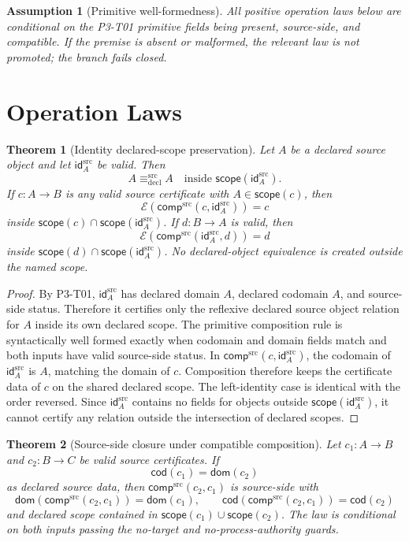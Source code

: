 \documentclass[11pt]{article}
\newcommand{\Cdom}{\mathsf{dom}}
\newcommand{\Ccod}{\mathsf{cod}}
\newcommand{\CId}{\mathsf{id}^{\mathrm{src}}}
\newcommand{\CComp}{\mathsf{comp}^{\mathrm{src}}}
\newcommand{\Scope}{\mathsf{scope}}
\newcommand{\DeclEq}{\equiv_{\mathrm{decl}}^{\mathrm{src}}}
\newtheorem{assumption}{Assumption}
\newtheorem{theorem}{Theorem}
\begin{document}
\begin{assumption}[Primitive well-formedness]
All positive operation laws below are conditional on the P3-T01 primitive
fields being present, source-side, and compatible. If the premise is absent or
malformed, the relevant law is not promoted; the branch fails closed.
\end{assumption}

\section{Operation Laws}

\begin{theorem}[Identity declared-scope preservation]
Let \(A\) be a declared source object and let \(\CId_A\) be valid. Then
\[
  A \DeclEq A \quad \text{inside } \Scope(\CId_A).
\]
If \(c:A\to B\) is any valid source certificate with \(A\in\Scope(c)\), then
\[
  \mathcal E(\CComp(c,\CId_A)) = c
\]
inside \(\Scope(c)\cap\Scope(\CId_A)\). If \(d:B\to A\) is valid, then
\[
  \mathcal E(\CComp(\CId_A,d)) = d
\]
inside \(\Scope(d)\cap\Scope(\CId_A)\). No declared-object equivalence is
created outside the named scope.
\end{theorem}

\begin{proof}
By P3-T01, \(\CId_A\) has declared domain \(A\), declared codomain \(A\), and
source-side status. Therefore it certifies only the reflexive declared source
object relation for \(A\) inside its own declared scope. The primitive
composition rule is syntactically well formed exactly when codomain and domain
fields match and both inputs have valid source-side status. In
\(\CComp(c,\CId_A)\), the codomain of \(\CId_A\) is \(A\), matching the
domain of \(c\). Composition therefore keeps the certificate data of \(c\) on
the shared declared scope. The left-identity case is identical with the order
reversed. Since \(\CId_A\) contains no fields for objects outside
\(\Scope(\CId_A)\), it cannot certify any relation outside the intersection
of declared scopes.
\end{proof}

\begin{theorem}[Source-side closure under compatible composition]
Let \(c_1:A\to B\) and \(c_2:B\to C\) be valid source certificates. If
\[
  \Ccod(c_1)=\Cdom(c_2)
\]
as declared source data, then \(\CComp(c_2,c_1)\) is source-side with
\[
  \Cdom(\CComp(c_2,c_1))=\Cdom(c_1),\qquad
  \Ccod(\CComp(c_2,c_1))=\Ccod(c_2)
\]
and declared scope contained in \(\Scope(c_1)\cup\Scope(c_2)\). The law is
conditional on both inputs passing the no-target and no-process-authority
guards.
\end{theorem}
\end{document}

